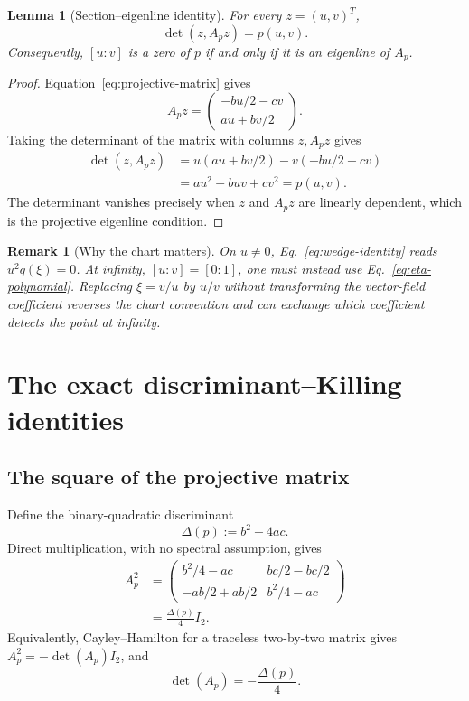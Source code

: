 \documentclass[11pt]{article}
\numberwithin{equation}{section}
\newtheorem{lemma}[theorem]{Lemma}
\newtheorem{remark}[theorem]{Remark}
\begin{document}
\begin{lemma}[Section--eigenline identity]
For every \(z=(u,v)^T\),
\begin{equation}
 \boxed{\det(z,A_pz)=p(u,v).}
 \label{eq:wedge-identity}
\end{equation}
Consequently, \([u:v]\) is a zero of \(p\) if and only if it is an
eigenline of \(A_p\).
\end{lemma}

\begin{proof}
Equation~\eqref{eq:projective-matrix} gives
\begin{equation}
 A_pz=
 \begin{pmatrix}-bu/2-cv\\au+bv/2\end{pmatrix}.
\end{equation}
Taking the determinant of the matrix with columns \(z,A_pz\) gives
\begin{align}
 \det(z,A_pz)
 &=u(au+bv/2)-v(-bu/2-cv)\\
 &=au^2+buv+cv^2=p(u,v).
\end{align}
The determinant vanishes precisely when \(z\) and \(A_pz\) are linearly
dependent, which is the projective eigenline condition.
\end{proof}

\begin{remark}[Why the chart matters]
On \(u\ne0\), Eq.~\eqref{eq:wedge-identity} reads
\(u^2q(\xi)=0\).  At infinity, \([u:v]=[0:1]\), one must instead use
Eq.~\eqref{eq:eta-polynomial}.  Replacing \(\xi=v/u\) by \(u/v\) without
transforming the vector-field coefficient reverses the chart convention and
can exchange which coefficient detects the point at infinity.
\end{remark}

\section{The exact discriminant--Killing identities}

\subsection{The square of the projective matrix}

Define the binary-quadratic discriminant
\begin{equation}
 \Delta(p):=b^2-4ac.
 \label{eq:discriminant}
\end{equation}
Direct multiplication, with no spectral assumption, gives
\begin{align}
 A_p^2
 &=
 \begin{pmatrix}
 b^2/4-ac&bc/2-bc/2\\
 -ab/2+ab/2&b^2/4-ac
 \end{pmatrix}\\
 &=\boxed{\frac{\Delta(p)}4I_2}.
 \label{eq:A-square}
\end{align}
Equivalently, Cayley--Hamilton for a traceless two-by-two matrix gives
\(A_p^2=-\det(A_p)I_2\), and
\begin{equation}
 \det(A_p)=-\frac{\Delta(p)}4.
 \label{eq:det-A}
\end{equation}
\end{document}
